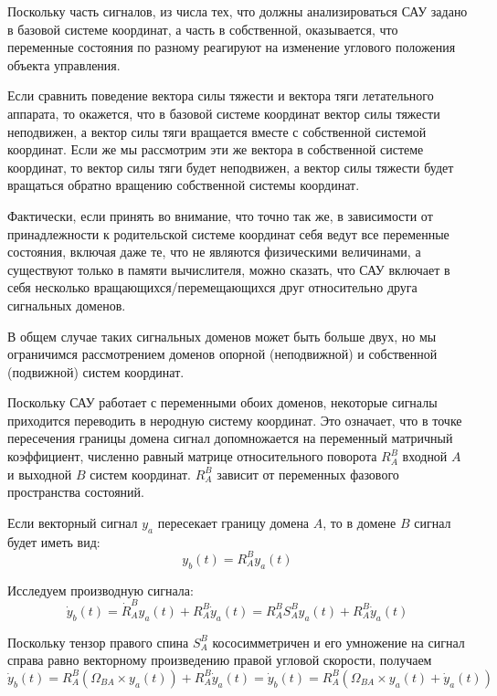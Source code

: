\documentclass[a4paper]{article}
\begin{document}
Поскольку часть сигналов, из числа тех, что должны анализироваться САУ задано в базовой системе координат, а часть в собственной, оказывается, что переменные состояния по разному реагируют на изменение углового положения объекта управления. 

Если сравнить поведение вектора силы тяжести и вектора тяги летательного аппарата, то окажется, что в базовой системе координат вектор силы тяжести неподвижен, а вектор силы тяги вращается вместе с собственной системой координат. Если же мы рассмотрим эти же вектора в собственной системе координат, то вектор силы тяги будет неподвижен, а вектор силы тяжести будет вращаться обратно вращению собственной системы координат.

Фактически, если принять во внимание, что точно так же, в зависимости от принадлежности к родительской системе координат себя ведут все переменные состояния, включая даже те, что не являются физическими величинами, а существуют только в памяти вычислителя, можно сказать, что САУ включает в себя несколько вращающихся/перемещающихся друг относительно друга сигнальных доменов.

В общем случае таких сигнальных доменов может быть больше двух, но мы ограничимся рассмотрением доменов опорной (неподвижной) и собственной (подвижной) систем координат. 

Поскольку САУ работает с переменными обоих доменов, некоторые сигналы приходится переводить в неродную систему координат. Это означает, что в точке пересечения границы домена сигнал допомножается на переменный матричный коэффициент, численно равный матрице относительного поворота $R_A^B$ входной $A$ и выходной $B$ систем координат. $R_A^B$ зависит от переменных фазового пространства состояний.

Если векторный сигнал $y_a$ пересекает границу домена $A$, то в домене $B$ сигнал будет иметь вид:
\begin{equation} y_b(t) = R_A^B y_a(t) \end{equation}

Исследуем производную сигнала:
\begin{equation} \dot{y}_b(t) = \dot{R}_A^B y_a(t) + R_A^B \dot{y}_a(t) = 
R_A^B S_A^B y_a(t) + R_A^B \dot{y}_a(t) \end{equation}

Поскольку тензор правого спина $S_A^B$ кососимметричен и его умножение на сигнал справа равно векторному произведению правой угловой скорости, получаем
\begin{equation} \dot{y}_b(t) = R_A^B (\Omega_{BA} \times y_a(t)) + R_A^B \dot{y}_a(t) = \dot{y}_b(t) = R_A^B(\Omega_{BA} \times y_a(t) + \dot{y}_a(t))\end{equation}
\end{document}

